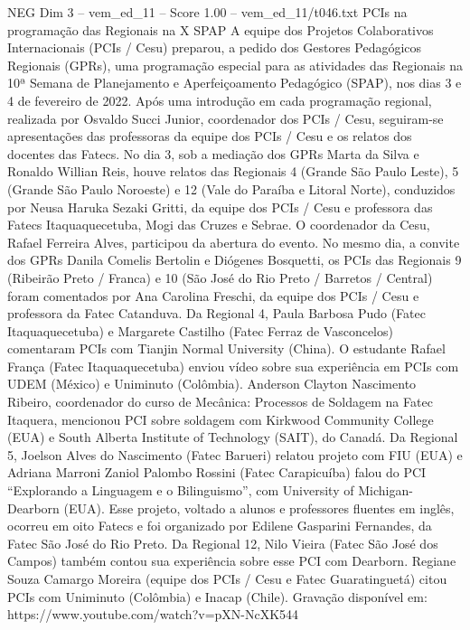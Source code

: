 \begin{textsample}{NEG Dim 3 – vem\_ed\_11 – Score 1.00 – vem\_ed\_11/t046.txt}  \label{ex:f3_neg_084}
PCIs na programação das Regionais na X SPAP A equipe dos Projetos Colaborativos Internacionais (PCIs / Cesu) preparou, a pedido dos Gestores Pedagógicos Regionais (GPRs), uma programação especial para as atividades das Regionais na 10ª Semana de Planejamento e Aperfeiçoamento Pedagógico (SPAP), nos dias 3 e 4 de fevereiro de 2022.
Após uma introdução em cada programação regional, realizada por Osvaldo Succi Junior, coordenador dos PCIs / Cesu, seguiram-se apresentações das professoras da equipe dos PCIs / Cesu e os relatos dos docentes das Fatecs.
No dia 3, sob a mediação dos GPRs Marta da Silva e Ronaldo Willian Reis, houve relatos das Regionais 4 (Grande São Paulo Leste), 5 (Grande São Paulo Noroeste) e 12 (Vale do Paraíba e Litoral Norte), conduzidos por Neusa Haruka Sezaki Gritti, da equipe dos PCIs / Cesu e professora das Fatecs Itaquaquecetuba, Mogi das Cruzes e Sebrae.
O coordenador da Cesu, Rafael Ferreira Alves, participou da abertura do evento.
No mesmo dia, a convite dos GPRs Danila Comelis Bertolin e Diógenes Bosquetti, os PCIs das Regionais 9 (Ribeirão Preto / Franca) e 10 (São José do Rio Preto / Barretos / Central) foram comentados por Ana Carolina Freschi, da equipe dos PCIs / Cesu e professora da Fatec Catanduva.
Da Regional 4, Paula Barbosa Pudo (Fatec Itaquaquecetuba) e Margarete Castilho (Fatec Ferraz de Vasconcelos) comentaram PCIs com Tianjin Normal University (China).
O estudante Rafael França (Fatec Itaquaquecetuba) enviou vídeo sobre sua experiência em PCIs com UDEM (México) e Uniminuto (Colômbia).
Anderson Clayton Nascimento Ribeiro, coordenador do curso de Mecânica: Processos de Soldagem na Fatec Itaquera, mencionou PCI sobre soldagem com Kirkwood Community College (EUA) e South Alberta Institute of Technology (SAIT), do Canadá.
Da Regional 5, Joelson Alves do Nascimento (Fatec Barueri) relatou projeto com FIU (EUA) e Adriana Marroni Zaniol Palombo Rossini (Fatec Carapicuíba) falou do PCI “Explorando a Linguagem e o Bilinguismo”, com University of Michigan-Dearborn (EUA).
Esse projeto, voltado a alunos e professores fluentes em inglês, ocorreu em oito Fatecs e foi organizado por Edilene Gasparini Fernandes, da Fatec São José do Rio Preto.
Da Regional 12, Nilo Vieira (Fatec São José dos Campos) também contou sua experiência sobre esse PCI com Dearborn.
Regiane Souza Camargo Moreira (equipe dos PCIs / Cesu e Fatec Guaratinguetá) citou PCIs com Uniminuto (Colômbia) e Inacap (Chile).
Gravação disponível em: https://www.youtube.com/watch?v=pXN-NcXK544

\end{textsample}
